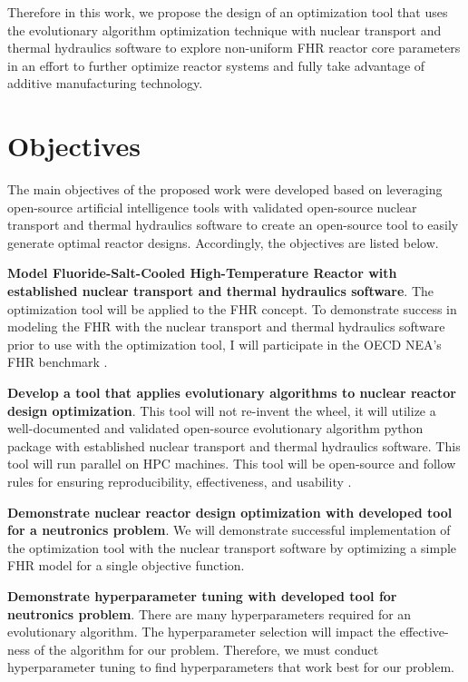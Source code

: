 Therefore in this work, we propose the design of an optimization tool that uses 
the evolutionary algorithm optimization technique with nuclear transport and 
thermal hydraulics software to explore non-uniform \gls{FHR} reactor core parameters 
in an effort to further optimize reactor systems and fully take advantage of 
additive manufacturing technology.  


\section{Objectives}
The main objectives of the proposed work were developed based on leveraging open-source 
artificial intelligence tools with validated open-source nuclear transport and 
thermal hydraulics software to create an open-source tool to easily generate 
optimal reactor designs. 
Accordingly, the objectives are listed below. 

\vspace{0.2cm} 
\noindent
\textbf{Model Fluoride-Salt-Cooled High-Temperature Reactor with established 
nuclear transport and thermal hydraulics software}.
The optimization tool will be applied to the \gls{FHR} concept. 
To demonstrate success in modeling the \gls{FHR} with the nuclear transport and 
thermal hydraulics software prior to use with the optimization tool, I will participate 
in the \gls{OECD} \gls{NEA}'s \gls{FHR} benchmark \cite{noauthor_fluoride_nodate}. 

\vspace{0.2cm} 
\noindent
\textbf{Develop a tool that applies evolutionary algorithms to nuclear 
reactor design optimization}. 
This tool will not re-invent the wheel, it will utilize a well-documented 
and validated open-source evolutionary algorithm python package with established 
nuclear transport and thermal hydraulics software. This tool will run parallel on 
\gls{HPC} machines. This tool will be open-source and follow rules for ensuring 
reproducibility, effectiveness, and usability 
\cite{list_ten_2017,osborne_ten_2014,sandve_ten_2013}. 

\vspace{0.2cm} 
\noindent
\textbf{Demonstrate nuclear reactor design optimization with developed tool 
for a neutronics problem}. 
We will demonstrate successful implementation of the optimization tool with the 
nuclear transport software by optimizing a simple \gls{FHR} model for a single 
objective function. 

\vspace{0.2cm} 
\noindent
\textbf{Demonstrate hyperparameter tuning with developed tool for neutronics problem}.
There are many hyperparameters required for an evolutionary algorithm. 
The hyperparameter selection will impact the effective-ness of the algorithm 
for our problem. 
Therefore, we must conduct hyperparameter tuning to find hyperparameters that work 
best for our problem. 

